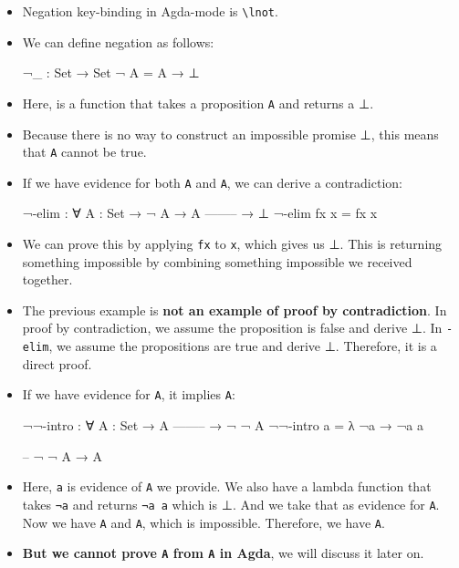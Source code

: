 \documentclass{lecturenotes}
\newcommand{\agdaempty}{\textsf{⊥}\xspace}
\begin{document}
\begin{itemize}
\item Negation key-binding in Agda-mode is \texttt{\textbackslash lnot}. 
\item We can define negation as follows:
\begin{code}
¬_ : Set → Set
¬ A = A → ⊥
\end{code}
\item Here, \texttt{\lnot} is a function that takes a proposition \texttt{A} and returns a \agdaempty.
\item Because there is no way to construct an impossible promise \agdaempty, this means that \texttt{A} cannot be true.

\item If we have evidence for both \texttt{\lnot A} and \texttt{A}, we can derive a contradiction:
\begin{code}
¬-elim : ∀ {A : Set}
    → ¬ A
    → A
    --------
    → ⊥
¬-elim fx x = fx x
\end{code}
\item We can prove this by applying \texttt{fx} to \texttt{x}, which gives us \agdaempty.
      This is returning something impossible by combining something impossible we received together.

\item The previous example is \textbf{not an example of proof by contradiction}.
      In proof by contradiction, we assume the proposition is false and derive \agdaempty.
      In \texttt{\lnot -elim}, we assume the propositions are true and derive \agdaempty.
      Therefore, it is a direct proof.

\item If we have evidence for \texttt{A}, it implies \texttt{\lnot \lnot A}:
\begin{code}
¬¬-intro : ∀ {A : Set}
    → A
    --------
    → ¬ ¬ A
¬¬-intro a = λ {¬a → ¬a a}

-- ¬ ¬ A → A
\end{code}
\item Here, \texttt{a} is evidence of \texttt{A} we provide. We also have a lambda function that 
      takes \texttt{¬a} and returns \texttt{¬a a} which is \agdaempty. And we take that as evidence for \texttt{\lnot A}. 
      Now we have \texttt{A} and \texttt{\lnot A}, which is impossible. Therefore, we have \texttt{\lnot \lnot A}.
\item \textbf{But we cannot prove \texttt{A} from \texttt{\lnot \lnot A} in Agda}, we will discuss it later on.


\end{itemize}
\end{document}
